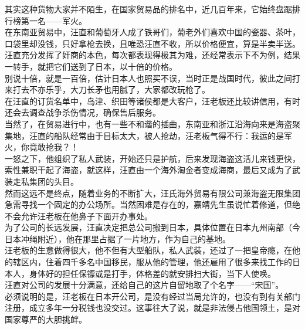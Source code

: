 \begin{multicols}{\theparacolNo}
其实这种货物大家并不陌生，在国家贸易品的排名中，近几百年来，它始终盘踞排行榜第一名——军火。\\

在东南亚贸易中，汪直和葡萄牙人成了铁哥们，葡老外们喜欢中国的瓷器、茶叶，口袋里却没钱，只好拿枪去换，且唯恐汪直不收，所以价格便宜，算是半卖半送。\\

汪直充分发挥了奸商的本色，每次都表现得极其为难，还经常表示下不为例，结果一转手，就把它们送到了日本，以十倍的价格。\\

别说十倍，就是一百倍，估计日本人也照买不误，当时正是战国时代，彼此之间打来打去不亦乐乎，大刀长矛也用腻了，大家都改玩枪了。\\

在汪直的订货名单中，岛津、织田等诸侯都是大客户，汪老板还比较讲信用，有时还会去调查战争杀伤情况，确保售后服务。\\

当然了，在贸易进行中，也有一些不和谐的插曲，东南亚和浙江沿海向来是海盗聚集地，汪直的船队经常由于目标太大，被人抢劫，汪老板气得不行：我运的是军火，你竟敢抢我？！\\

一怒之下，他组织了私人武装，开始还只是护航，后来发现海盗这活儿来钱更快，索性兼职干起了海盗，就这样，汪直由一个海外淘金者变成海商，最后又成为了武装走私集团的头目。\\

然而这远不是终点，随着业务的不断扩大，汪氏海外贸易有限公司兼海盗无限集团急需寻找一个固定的办公场所。当然困难是存在的，嘉靖先生虽说忙着修道，但绝不会允许汪老板在他鼻子下面开办事处。\\

为了公司的长远发展，汪直决定把总公司搬到日本，具体位置在日本九州南部（今日本冲绳附近），他在那里占据了一片地方，作为自己的基地。\\

汪老板的生意做得很大，他不但有大型船队，私人武装，还过了一把皇帝瘾，在他的辖区内，住着四千多名中国移民，服从他的管理，他还雇用了很多来找工作的日本人，身体好的担任保镖或是打手，体格差的就安排扫大街，当下人使唤。\\

汪直对公司的发展十分满意，还给自己的这片自留地取了个名字——“宋国”。\\

必须说明的是，汪老板在日本开公司，是没有经过当局允许的，也没有到有关部门注册，成立多年一分税钱也没交过。这事往大了说，就是非法侵占他国领土，是对国家尊严的大胆挑衅。\\


\end{multicols}
